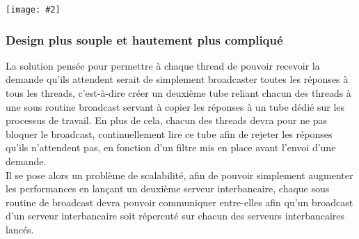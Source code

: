 \documentclass[french, a4paper, 12pt, titlepage]{article}
\newcommand{\graph}[2]{
\medskip
	\begin{center}
		\texttt{[image: \#2]}
	\end{center}
\medskip
}
\begin{document}
\graph{0.4}{piscine}


\subsubsection{Design plus souple et hautement plus compliqué}
La solution pensée pour permettre à chaque thread de pouvoir recevoir la demande qu'ils attendent serait de simplement broadcaster toutes les réponses à tous les threads, c'est-à-dire créer un deuxième tube reliant chacun des threads à une sous routine \og broadcast\fg{} servant à copier les réponses à un tube dédié sur les processus de travail.
En plus de cela, chacun des threads devra pour ne pas bloquer le broadcast, continuellement lire ce tube afin de rejeter les réponses qu'ils n'attendent pas, en fonction d'un filtre mis en place avant l'envoi d'une demande.\\
\noindent
Il se pose alors un problème de scalabilité, afin de pouvoir simplement augmenter les performances en lançant un deuxième serveur interbancaire, chaque sous routine de broadcast devra pouvoir communiquer entre-elles afin qu'un broadcast d'un serveur interbancaire soit répercuté sur chacun des serveurs interbancaires lancés.
\end{document}
